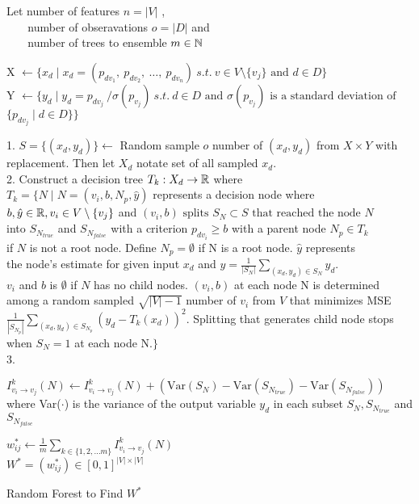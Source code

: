 \begin{algorithm}
    \DontPrintSemicolon
    \SetAlgoLined

    Let number of features $n = |V|$ , \\
    $\:\:\:\:\:\:\:$ number of obseravations $o = |D|$ and \\
    $\:\:\:\:\:\:\:$ number of trees to ensemble $ m \in \Bbb N$

     {
    X $\gets \{ x_d \mid x_d = (p_{dv_1},\: p_{dv_2},\: \ldots, \:p_{dv_{n}}) \: s.t. \: v \in V \setminus{\{v_j\}} \text{ and } d \in D \} \:$  \\
    Y $\gets \{ y_d  \mid y_d = p_{dv_j} \: / \sigma(p_{v_j}) \: s.t. \: d \in D \text{ and } \sigma(p_{v_j}) \text{ is a standard deviation of }$ \\
    $\{ p_{dv_j} \mid d \in D \} \}$\\

     {
    1. $S = \{(x_d, y_d)\} \gets $ Random sample $o$ number of $(x_d, y_d)$ from $X \times Y$ with replacement. Then let $X_d$ notate set of all sampled $x_d$. \\
    2. Construct a decision tree $T_k: X_d \to \Bbb R$ where\\
    $T_k = \{ N \mid N = (v_i, b, N_p, \hat{y}) $ represents a decision node where \\
    $ b, \hat{y} \in \Bbb R, v_i \in V \setminus{\{v_j\}} $ and $(v_i, b) \text{ splits } S_N \subset S \text{ that reached the node } N $\\
    into $S_{N_{true}}$ and $S_{N_{false}}$ with a criterion $p_{dv_i} \ge b$ with a parent node $ N_p \in T_k$ \\             if $N$ is not a root node. Define $N_p = \emptyset$ if N is a root node. $\hat{y}$ represents \\
    the node's estimate for given input $x_d$ and $\hat{y} = \frac{1}{|S_N|}\sum_{(x_d, y_d) \in S_N}y_d$.\\
    $v_i$ and $b$ is $\emptyset$ if $N$ has no child nodes.
    $(v_i, b)$ at each node N is determined \\ among a random sampled $\sqrt{|V|-1}$ number of $v_i$ from $V$ that minimizes MSE $\frac{1}{|S_{N_p}|}\sum_{(x_d, y_d) \in S_{N_p}}(y_d - T_k(x_d))^2$. Splitting that generates child node stops when $S_N=1$ at each node N.$\}$\\
    3.
     {
    {
    $I^k_{v_i \to v_j}(N) \gets I^k_{v_i \to v_j}(N) + (\text{Var}(S_N) - \text{Var}(S_{N_{true}}) - \text{Var}(S_{N_{false}}))$ where Var($\cdot$) is the variance
    of the output variable $y_d$ in each subset $S_N, S_{N_{true}}$ and $S_{N_{false}}$
    }

    }

    }
    }
     $w^*_{ij} \gets \frac{1}{m}\sum_{k \in \{ 1, 2, ... m\}} I^k_{v_i \to v_j}(N)$ \\
     $W^* = (w^*_{ij}) \in [0,1]^{|V| \times |V|}$
    \caption{Random Forest to Find $W^*$}
    \label{rf}
\end{algorithm}